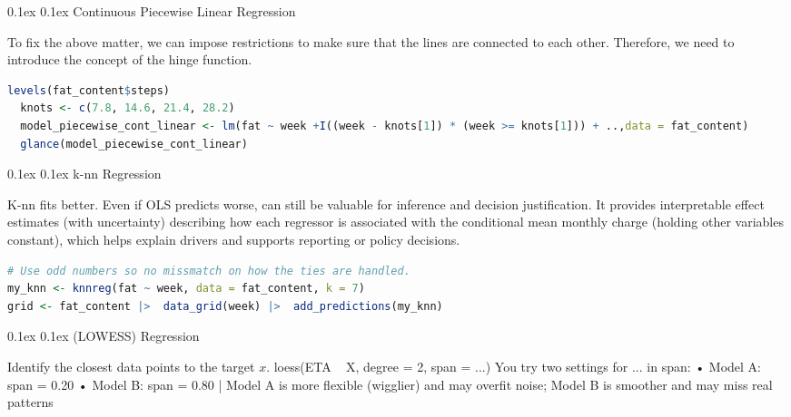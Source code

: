 \documentclass[8pt,landscape]{article}
\makeatletter
\renewcommand{\section}{\@startsection{section}{2}{0pt}%
    {0.1ex}%
    {0.1ex}%
    {\fontsize{8}{9}\bfseries\color{red}}} %
\renewcommand{\subsection}{\@startsection{subsection}{2}{0pt}%
    {0.1ex}%
    {0.1ex}%
    {\fontsize{8}{9}\bfseries\color{blue}}} %
\newcommand{\smalltext}[1]{
  {\fontsize{8}{9}\selectfont\sloppy #1\par}
}
\makeatother
\begin{document}
\begin{multicols}{3}
\subsection{Continuous Piecewise Linear Regression}
\smalltext{
  To fix the above matter, we can impose restrictions to make sure that the lines are connected to each other. Therefore, we need to introduce the concept of the hinge function.
}
\begin{lstlisting}[language=R]
  levels(fat_content$steps)
  knots <- c(7.8, 14.6, 21.4, 28.2)
  model_piecewise_cont_linear <- lm(fat ~ week +I((week - knots[1]) * (week >= knots[1])) + ..,data = fat_content)
  glance(model_piecewise_cont_linear)
\end{lstlisting}

\section{k-nn Regression}
\smalltext{
  K-nn fits better. Even if OLS predicts worse, can still be valuable for inference and decision justification. It
  provides interpretable effect estimates (with uncertainty) describing how each regressor is associated
  with the conditional mean monthly charge (holding other variables constant), which helps explain drivers
  and supports reporting or policy decisions.
}

\begin{lstlisting}[language=R]
# Use odd numbers so no missmatch on how the ties are handled.
my_knn <- knnreg(fat ~ week, data = fat_content, k = 7)
grid <- fat_content |>  data_grid(week) |>  add_predictions(my_knn)
\end{lstlisting}

\section{(LOWESS) Regression}
\smalltext{
  Identify the closest data points to the target $x$. 
  loess(ETA ~ X, degree = 2, span = ...)
  You try two settings for ... in span:
• Model A: span = 0.20
• Model B: span = 0.80 |
Model A is more flexible (wigglier) and may overfit noise; Model B is smoother and
  may miss real patterns
  }


\end{multicols}
\end{document}
